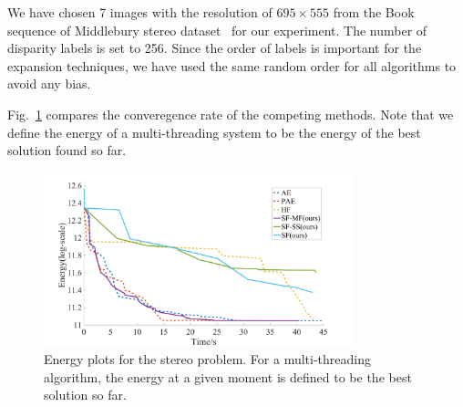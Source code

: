 
\noindent We have chosen 7 images with the resolution of $695\times555$
from the Book sequence of Middlebury stereo dataset~\cite{middlebury_stereo} for our
experiment. The number of disparity labels is
set to 256.
%
Since the order of labels is important for the expansion techniques,
we have used the same random order for all algorithms to avoid any
bias.
%

Fig.~\ref{fig:stereo_global} compares the converegence rate of the
competing methods. Note that we define the energy of a multi-threading
system to be the energy of the best solution found so far.
%

\begin{figure}[tb]
\centering
\includegraphics[width=0.8\textwidth]{figure/stereo_global.png}
\caption{Energy plots for the stereo problem. For a multi-threading algorithm, the energy at a given moment is
defined to be the best solution so far.}
\label{fig:stereo_global}
\end{figure}
%

